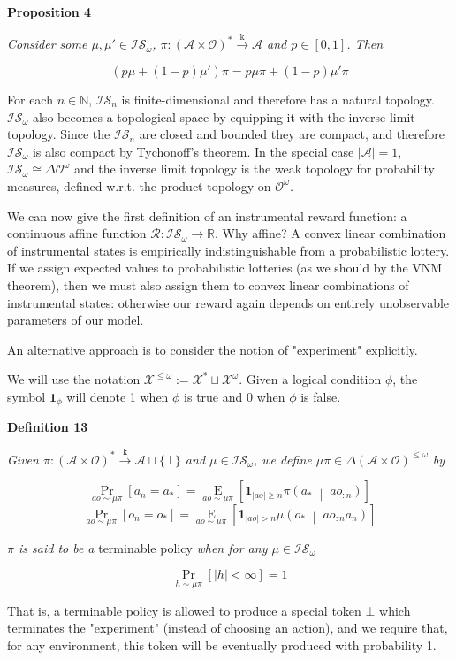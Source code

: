 \documentclass[a4paper]{article}
\newcommand{\Co}[1]{}
\newcommand{\AP}[1]{\left(#1\right)}
\newcommand{\AB}[1]{\left[#1\right]}
\newcommand{\APM}[2]{\left(#1\;\middle\vert\;#2\right)}
\newcommand{\Abs}[1]{\left\vert #1 \right\vert}
\newcommand{\Pa}[2]{\underset{#1}{\operatorname{Pr}}\AB{#2}}
\newcommand{\Ea}[2]{\underset{#1}{\operatorname{E}}\AB{#2}}
\newcommand{\Nats}{\mathbb{N}}
\newcommand{\Reals}{\mathbb{R}}
\newcommand{\K}{\xrightarrow{\mathrm{k}}}
\newcommand{\KD}[1]{\boldsymbol{1}_{#1}}
\newcommand{\A}{\mathcal{A}}
\newcommand{\AX}{\A\sqcup\{\bot\}}
\newcommand{\Ob}{\mathcal{O}}
\newcommand{\AO}{\AP{\A\times\Ob}}
\newcommand{\FH}{\AO^*}
\newcommand{\R}{\mathcal{R}}
\newcommand{\IS}{\mathcal{IS}}
\newcommand{\X}{\mathcal{X}}
\begin{document}
\textbf{Proposition 4}\Co{b}

\textit{Consider some $\mu,\mu'\in\IS_\omega$,  $\pi:\FH\K\A$ and $p\in[0,1]$. Then}\Co{i}

$$\AP{p\mu+(1-p)\mu'}\pi=p\mu\pi+(1-p)\mu'\pi$$

For each $n\in\Nats$, $\IS_n$ is finite-dimensional and therefore has a natural topology. $\IS_\omega$ also becomes a topological space by equipping it with the inverse limit topology. Since the $\IS_n$ are closed and bounded they are compact, and therefore $\IS_\omega$ is also compact by Tychonoff's theorem. In the special case $\Abs{\A}=1$, $\IS_\omega\cong\Delta\Ob^\omega$ and the inverse limit topology is the weak topology for probability measures, defined w.r.t. the product topology on $\Ob^\omega$.

We can now give the first definition of an instrumental reward function: a continuous affine function $\R: \IS_\omega \rightarrow \Reals$. Why affine? A convex linear combination of instrumental states is empirically indistinguishable from a probabilistic lottery. If we assign expected values to probabilistic lotteries (as we should by the VNM theorem), then we must also assign them to convex linear combinations of instrumental states: otherwise our reward again depends on entirely unobservable parameters of our model.

An alternative approach is to consider the notion of "experiment" explicitly.

We will use the notation $\X^{\leq\omega}:=\X^*\sqcup\X^\omega$. Given a logical condition $\phi$, the symbol $\KD{\phi}$ will denote 1 when $\phi$ is true and 0 when $\phi$ is false.

\textbf{Definition 13}\Co{b}

\textit{Given $\pi: \FH\K\AX$ and $\mu\in\IS_\omega$, we define $\mu\pi\in\Delta\AO^{\leq\omega}$ by}\Co{i}

$$\Pa{ao\sim\mu\pi}{a_n=a_*}=\Ea{ao\sim\mu\pi}{\KD{\Abs{ao}\geq n}\pi\APM{a_*}{ao_{:n}}}$$
$$\Pa{ao\sim\mu\pi}{o_n=o_*}=\Ea{ao\sim\mu\pi}{\KD{\Abs{ao}> n}\mu\APM{o_*}{ao_{:n}a_n}}$$

\textit{$\pi$ is said to be a}\Co{i} terminable policy \textit{when for any $\mu\in\IS_\omega$}\Co{i}

$$\Pa{h\sim\mu\pi}{\Abs{h}<\infty} = 1$$

That is, a terminable policy is allowed to produce a special token $\bot$ which terminates the "experiment" (instead of choosing an action), and we require that, for any environment, this token will be eventually produced with probability 1.
\end{document}
